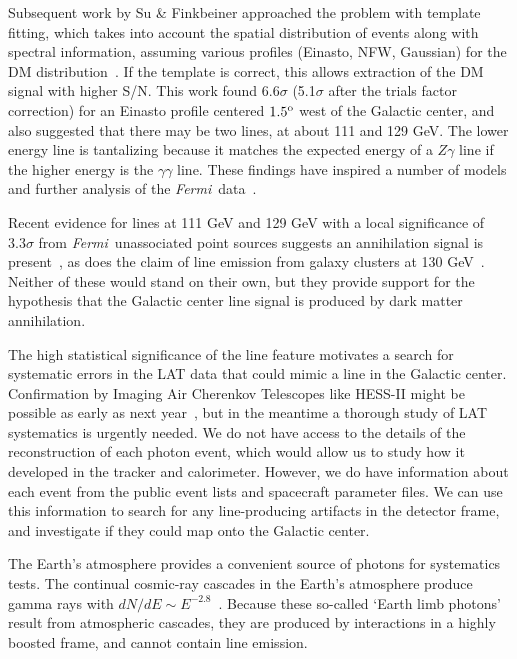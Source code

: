 \documentclass[aps,prd,superscriptaddress,showpacs,nofootinbib,fixlfloat, 12pt]{revtex4-1}
\newcommand{\Fermi}{{\slshape Fermi}}
\newcommand{\degree}{^{\rm o}}
\begin{document}
Subsequent work by Su \& Finkbeiner approached the problem
with template fitting, which takes into account the spatial
distribution of events along with spectral information,
assuming various profiles (Einasto, NFW, Gaussian) for the
DM distribution~\citep{linepaper}.  If the template is
correct, this allows extraction of the DM signal with higher
S/N.  This work found 6.6$\sigma$ (5.1$\sigma$ after the
trials factor correction) for an Einasto profile centered
$1.5\degree$ west of the Galactic center, and also suggested
that there may be two lines, at about 111 and 129 GeV.  The
lower energy line is tantalizing because it matches the
expected energy of a $Z\gamma$ line if the higher energy is
the $\gamma\gamma$ line.  These findings have inspired a
number of models and further analysis of the \Fermi\
data~\citep{Dudas:2012, Choi:2012, Kyae:2012, Lee:2012,
Rajaraman:2012, Acharya:2012, Garny:2012, Buckley:2012,
Chu:2012, Kang:2012, Buchmuller:2012, Bergstrom:2012b,
Heo:2012, Park:2012, Tulin:2012, Cline:2012, Weiner:2012,
WeinerYavin:2012b, FanReece:2012, Huang:2012, Whiteson:2012,
Buchmuller:2012, Cholis:2012}.

Recent evidence for lines at 111 GeV and 129 GeV with a
local significance of $3.3\sigma$ from \Fermi\ unassociated
point sources suggests an annihilation signal is
present~\cite{doubleline}\citep[but
see][]{HooperLinden:2012b}, as does the claim of line
emission from galaxy clusters at 130
GeV~\cite{Hektor:2012kc}.  Neither of these would stand on
their own, but they provide support for the hypothesis that
the Galactic center line signal is produced by dark matter
annihilation.

The high statistical significance of the line feature
motivates a search for systematic errors in the LAT data
that could mimic a line in the Galactic center.
Confirmation by Imaging Air Cherenkov Telescopes like
HESS-II might be possible as early as next
year~\cite{Bergstrom:2012}, but in the meantime a thorough
study of LAT systematics is urgently needed.  We do not have
access to the details of the reconstruction of each photon
event, which would allow us to study how it developed in the
tracker and calorimeter.  However, we do have information
about each event from the public event lists and spacecraft
parameter files.  We can use this information to search for
any line-producing artifacts in the detector frame, and
investigate if they could map onto the Galactic center.

The Earth's atmosphere provides a convenient source of
photons for systematics tests.  The continual cosmic-ray
cascades in the Earth's atmosphere produce gamma rays with
$dN/dE \sim E^{-2.8}$~\citep{FermiLimb}.  Because these
so-called `Earth limb photons' result from atmospheric
cascades, they are produced by interactions in a highly
boosted frame, and cannot contain line emission.
\medskip
\end{document}
